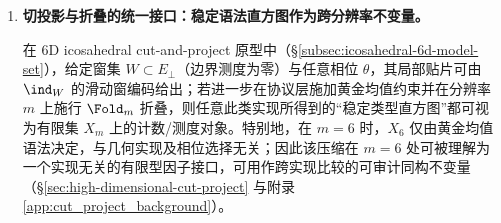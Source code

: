 \begin{enumerate}
  \begin{theorem}
  \label{thm:terminal-foldbin-saturation-diophantine}
  对任意 \(m\ge 1\)，二进制区间折叠 \(\mathrm{Fold}^{\mathrm{bin}}_m\) 的最大纤维由零词 \(0^m\) 取得：
  \[
  d^{\mathrm{bin}}_{\max}(m):=\max_{w\in X_m}d^{\mathrm{bin}}_m(w)=d^{\mathrm{bin}}_m(0^m).
  \]
  令 \(K(m)\) 为满足
  \[
  F_{K(m)+1}\le 2^m-1 < F_{K(m)+2}
  \]
  的唯一整数（定义 \ref{def:K-of-m}）。则有组合上界
  \[
  d^{\mathrm{bin}}_{\max}(m)\le F_{K(m)-m+2},
  \]
  并且上界饱和当且仅当阈值约束对所有合法尾部都冗余，即
  \[
  d^{\mathrm{bin}}_{\max}(m)=F_{K(m)-m+2}
  \quad\Longleftrightarrow\quad
  2^m-1\ge S_{\max}(m),
  \]
  其中
  \(
  S_{\max}(m)
  :=\max\{\sum_{k=m+1}^{K(m)}c_kF_{k+1}:\ c_k\in\{0,1\},\ c_kc_{k+1}=0\}
  \)
  具有完全显式闭式（由交错尾部 \(1010\cdots\) 取得）：
  \[
  S_{\max}(m)=
  \begin{cases}
  F_{K(m)+2}-F_{m+1}, & K(m)-m\ \text{为奇数},\\
  F_{K(m)+2}-F_{m+2}, & K(m)-m\ \text{为偶数},
  \end{cases}
  \]
  见推论 \ref{cor:fold-bin-saturation}。
  \end{theorem}

  \begin{corollary}\label{cor:terminal-foldbin-finite-saturation}
  若在某个 \(m\) 上发生饱和，则 \(2^m\) 与 \(F_{K(m)+2}\) 异常接近，并满足指数级小的对数线性形式约束
  \[
  \Bigl|(K(m)+2)\log\varphi-m\log 2-\log\sqrt5\Bigr|
  \ \lesssim\ \Bigl(\frac{\varphi}{2}\Bigr)^m.
  \]
  因而结合 Baker--W\"ustholz/Matveev 型下界可推出：饱和只能发生有限次（注 \ref{rem:fold-bin-finite}；并见表 \ref{tab:fold_binary_saturation_points} 的可复现审计输出）。
  \end{corollary}

  \item \textbf{切投影与折叠的统一接口：稳定语法直方图作为跨分辨率不变量。}

  \begin{proposition}[cut-and-project \texorpdfstring{$\Rightarrow$}{=>} 折叠直方图不变量的接口]
  \label{prop:terminal-cut-project-to-fold-hist}
  在 6D icosahedral cut-and-project 原型中（\S\ref{subsec:icosahedral-6d-model-set}），给定窗集 \(W\subset E_\perp\)（边界测度为零）与任意相位 \(\theta\)，其局部贴片可由 \(\ind_W\) 的滑动窗编码给出；若进一步在协议层施加黄金均值约束并在分辨率 \(m\) 上施行 \(\Fold_m\) 折叠，则任意此类实现所得到的“稳定类型直方图”都可视为有限集 \(X_m\) 上的计数/测度对象。特别地，在 \(m=6\) 时，\(X_6\) 仅由黄金均值语法决定，与几何实现及相位选择无关；因此该压缩在 \(m=6\) 处可被理解为一个实现无关的有限型因子接口，可用作跨实现比较的可审计同构不变量（\S\ref{sec:high-dimensional-cut-project} 与附录 \ref{app:cut_project_background}）。
  \end{proposition}


\end{enumerate}
